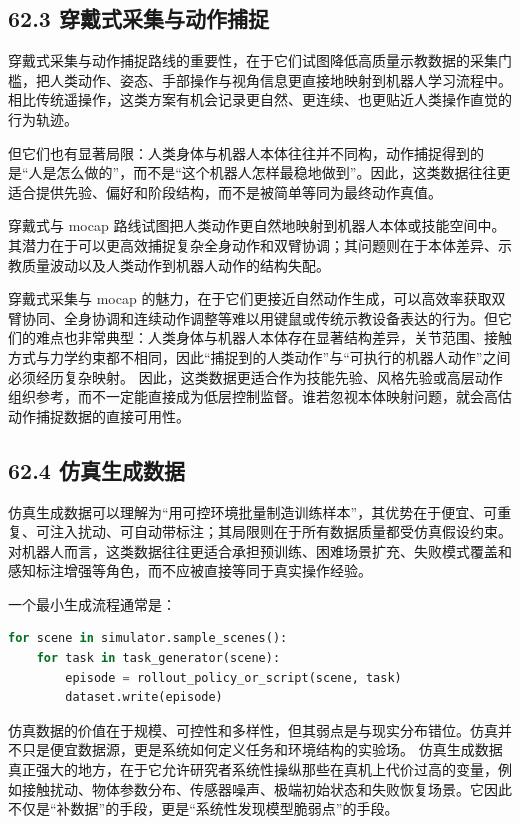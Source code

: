 \subsection*{62.3 穿戴式采集与动作捕捉}


穿戴式采集与动作捕捉路线的重要性，在于它们试图降低高质量示教数据的采集门槛，把人类动作、姿态、手部操作与视角信息更直接地映射到机器人学习流程中。相比传统遥操作，这类方案有机会记录更自然、更连续、也更贴近人类操作直觉的行为轨迹。

但它们也有显著局限：人类身体与机器人本体往往并不同构，动作捕捉得到的是“人是怎么做的”，而不是“这个机器人怎样最稳地做到”。因此，这类数据往往更适合提供先验、偏好和阶段结构，而不是被简单等同为最终动作真值。

穿戴式与 mocap 路线试图把人类动作更自然地映射到机器人本体或技能空间中。其潜力在于可以更高效捕捉复杂全身动作和双臂协调；其问题则在于本体差异、示教质量波动以及人类动作到机器人动作的结构失配。

穿戴式采集与 mocap 的魅力，在于它们更接近自然动作生成，可以高效率获取双臂协同、全身协调和连续动作调整等难以用键鼠或传统示教设备表达的行为。但它们的难点也非常典型：人类身体与机器人本体存在显著结构差异，关节范围、接触方式与力学约束都不相同，因此“捕捉到的人类动作”与“可执行的机器人动作”之间必须经历复杂映射。 因此，这类数据更适合作为技能先验、风格先验或高层动作组织参考，而不一定能直接成为低层控制监督。谁若忽视本体映射问题，就会高估动作捕捉数据的直接可用性。

\subsection*{62.4 仿真生成数据}


仿真生成数据可以理解为“用可控环境批量制造训练样本”，其优势在于便宜、可重复、可注入扰动、可自动带标注；其局限则在于所有数据质量都受仿真假设约束。对机器人而言，这类数据往往更适合承担预训练、困难场景扩充、失败模式覆盖和感知标注增强等角色，而不应被直接等同于真实操作经验。

一个最小生成流程通常是：

\begin{lstlisting}[language=python]
for scene in simulator.sample_scenes():
    for task in task_generator(scene):
        episode = rollout_policy_or_script(scene, task)
        dataset.write(episode)
\end{lstlisting}

仿真数据的价值在于规模、可控性和多样性，但其弱点是与现实分布错位。仿真并不只是便宜数据源，更是系统如何定义任务和环境结构的实验场。 仿真生成数据真正强大的地方，在于它允许研究者系统性操纵那些在真机上代价过高的变量，例如接触扰动、物体参数分布、传感器噪声、极端初始状态和失败恢复场景。它因此不仅是“补数据”的手段，更是“系统性发现模型脆弱点”的手段。

